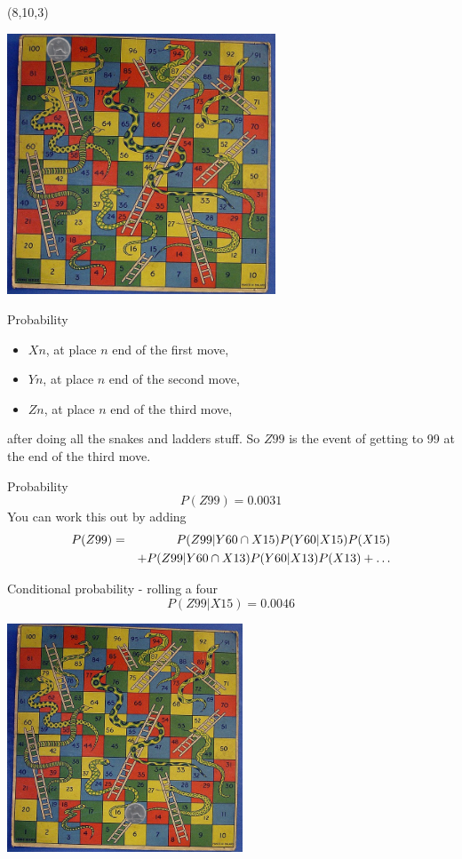 \documentclass{beamer}
\newcommand{\crish}{\color{reddish}}
\newcommand{\cbla}{\color{black}}
\begin{document}
\begin{frame}{(8,10,3)}
  \begin{center}
    \includegraphics[width=8cm]{game99.jpg}
  \end{center}
    \vfill
\tiny{}
\end{frame}

\begin{frame}{Probability}
\begin{itemize}
\item \crish $Xn$\cbla, at place \crish$n$\cbla{} end of the first move,
\item \crish $Yn$\cbla,  at place \crish$n$\cbla{} end of the second move,
\item \crish$Zn$\cbla{},  at place \crish$n$\cbla{} end of the third move,
\end{itemize}  
after doing all the snakes and ladders stuff.
\vskip 1cm So \crish$Z99$\cbla{} is the event of getting to 99 at the
end of the third move.
\end{frame}

\begin{frame}{Probability}
  \crish $$ P(Z99)=0.0031 $$ \cbla
  You can work this out by adding
  \crish
  \begin{eqnarray*}    
  P(Z99)&=&P(Z99|Y60\cap{}X15)P(Y60|X15)P(X15)\cr&&+P(Z99|Y60\cap{}X13)P(Y60|X13)P(X13)+\ldots\end{eqnarray*}\cbla{}
\end{frame}

\begin{frame}{Conditional probability - rolling a four}
    \crish $$ P(Z99|X15)=0.0046 $$ \cbla
  \begin{center}
    \includegraphics[width=7cm]{game15.jpg}
  \end{center}
\end{frame}
\end{document}

